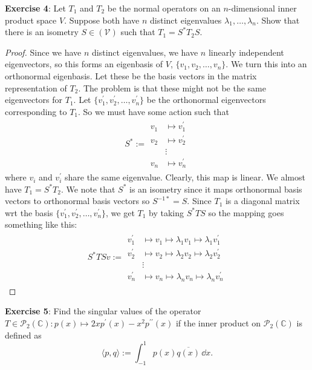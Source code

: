 \documentclass{article}
\begin{document}
\textbf{Exercise 4}: Let $T_{1}$ and $T_{2}$ be the normal operators on an $n$-dimensional inner product space $V$. Suppose both have $n$ distinct eigenvalues $\lambda_{1}, \ldots, \lambda_{n}$. Show that there is an isometry $S \in \mathcal{(V)}$ such that $T_{1} = S^{*}T_{2}S$.

\begin{proof}
	Since we have $n$ distinct eigenvalues, we have $n$ linearly independent eigenvectors, so this forms an eigenbasis of $V$, $\{v_{1}, v_{2}, \ldots, v_{n}\}$. We turn this into an orthonormal eigenbasis. Let these be the basis vectors in the matrix representation of $T_{2}$. The problem is that these might not be the same eigenvectors for $T_{1}$. Let $\{v_{1}^{\prime}, v_{2}^{\prime}, \ldots, v_{n}^{\prime}\}$ be the orthonormal eigenvectors corresponding to $T_{1}$. So we must have some action such that
	\begin{align*}
		S^{*}
		:= \begin{split}
			v_{1} &\mapsto v_{1}^{\prime} \\
			v_{2} &\mapsto v^{\prime}_{2} \\
			&\vdots \\
			v_{n} &\mapsto v^{\prime}_{n}
		\end{split}
	\end{align*}
	where $v_{i}$ and $v_{i}^{\prime}$ share the same eigenvalue. Clearly, this map is linear. We almost have $T_{1} = S^{*}T_{2}$. We note that $S^{*}$ is an isometry since it maps orthonormal basis vectors to orthonormal basis vectors so $S^{-1*} = S$. Since $T_{1}$ is a diagonal matrix wrt the basis $\{v_{1}^{\prime}, v_{2}^{\prime}, \ldots, v_{n}^{\prime}\}$, we get $T_{1}$ by taking $S^{*}TS$ so the mapping goes something like this:
	\begin{align*}
		S^{*}TSv := 
		\begin{split}
			v_{1}^{\prime} &\mapsto v_{1} \mapsto \lambda_{1}v_{1} \mapsto \lambda_{1}v_{1}^{\prime} \\
			v_{2}^{\prime} &\mapsto v_{2} \mapsto \lambda_{2}v_{2} \mapsto \lambda_{2}v_{2}^{\prime} \\
				       &\vdots \\
			v_{n}^{\prime} &\mapsto v_{n} \mapsto \lambda_{n}v_{n} \mapsto \lambda_{n}v_{n}^{\prime} 
		\end{split}
	\end{align*}
\end{proof}

\textbf{Exercise 5}: Find the singular values of the operator $T \in \mathcal{P}_{2}(\mathbb{C}): p(x) \mapsto 2xp^{\prime}(x) - x^{2}p^{\prime\prime}(x)$ if the inner product on $\mathcal{P}_{2}(\mathbb{C})$ is defined as 
\begin{equation*}
	\langle p, q \rangle := \int_{-1}^{1} p(x)\overline{q(x)} \,\dd{x}.
\end{equation*}
\end{document}
